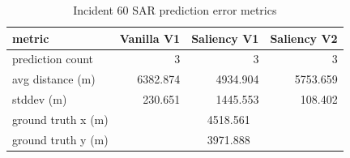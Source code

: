 \begin{table}[ht]
\centering
\caption{Incident 60 SAR prediction error metrics}
\label{tab:sar-incident-60}
\begin{tabular}{lrrr}
\hline
metric & Vanilla V1 & Saliency V1 & Saliency V2 \\
\hline
prediction count & 3 & 3 & 3 \\
avg distance (m) & 6382.874 & 4934.904 & 5753.659 \\
stddev (m) & 230.651 & 1445.553 & 108.402 \\
ground truth x (m) & \multicolumn{3}{c}{4518.561} \\
ground truth y (m) & \multicolumn{3}{c}{3971.888} \\
\hline
\end{tabular}
\end{table}
